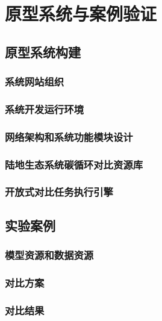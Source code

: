 \chapter{原型系统与案例验证}

\section{原型系统构建}
\subsection{系统网站组织}
\subsection{系统开发运行环境}
\subsection{网络架构和系统功能模块设计}
\subsection{陆地生态系统碳循环对比资源库}
\subsection{开放式对比任务执行引擎}

\section{实验案例}
\subsection{模型资源和数据资源}
\subsection{对比方案}
\subsection{对比结果}
